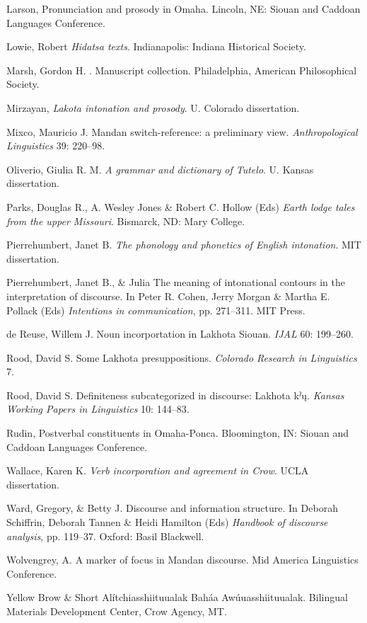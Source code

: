 \documentclass[output=paper]{LSP/langsci}
\begin{document}
\begin{reflist}
Larson, \citet{Rory2009} Pronunciation and prosody in Omaha. Lincoln, NE: Siouan and Caddoan Languages Conference. 

Lowie, Robert \citet{Harry1939} \emph{Hidatsa texts}. Indianapolis: Indiana Historical Society.

Marsh, Gordon H. . Manuscript collection. Philadelphia, American Philosophical Society.

Mirzayan, \citet{Armik2011} \emph{Lakota intonation and prosody}. U. Colorado dissertation.

Mixco, Mauricio J.  Mandan switch-reference: a preliminary view. \emph{Anthropological Linguistics} 39: 220--98.

Oliverio, Giulia R. M.  \emph{A grammar and dictionary of Tutelo}. U. Kansas dissertation.

Parks, Douglas R., A. Wesley Jones \& Robert C. Hollow (Eds)  \emph{Earth lodge tales from the upper Missouri}. Bismarck, ND: Mary College.

Pierrehumbert, Janet B.  \emph{The phonology and phonetics of English intonation}. MIT dissertation.

Pierrehumbert, Janet B., \& Julia \citet{Hirschberg1990} The meaning of intonational contours in the interpretation of discourse. In Peter R. Cohen, Jerry Morgan \& Martha E. Pollack (Eds) \emph{Intentions in communication}, pp. 271--311. MIT Press.

de Reuse, Willem J.  Noun incorportation in Lakhota Siouan. \emph{IJAL} 60: 199--260.

Rood, David S.  Some Lakhota presuppositions. \emph{Colorado Research in Linguistics} 7.

Rood, David S.  Definiteness subcategorized in discourse: Lakhota kˀų. \emph{Kansas Working Papers in Linguistics} 10: 144--83.

Rudin, \citet{Catherine1998} Postverbal constituents in Omaha-Ponca. Bloomington, IN: Siouan and Caddoan Languages Conference. 

Wallace, Karen K.  \emph{Verb incorporation and agreement in Crow}. UCLA dissertation.

Ward, Gregory, \& Betty J. \citet{Birner2001} Discourse and information structure. In Deborah Schiffrin, Deborah Tannen \& Heidi Hamilton (Eds) \emph{Handbook of discourse analysis}, pp. 119--37. Oxford: Basil Blackwell.

Wolvengrey, A.  A marker of focus in Mandan discourse. Mid America Linguistics Conference.

Yellow Brow \& Short \citet{Bull1980} Alítchiasshiituualak Baháa Awúuasshiituualak. Bilingual Materials Development Center, Crow Agency, MT.


\end{reflist}
\end{document}
